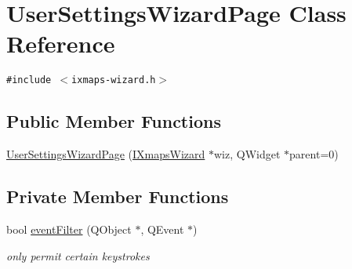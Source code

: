 \hypertarget{classUserSettingsWizardPage}{
\section{UserSettingsWizardPage Class Reference}
\label{classUserSettingsWizardPage}
}
{\tt \#include $<$ixmaps-wizard.h$>$}

\subsection*{Public Member Functions}
\begin{CompactItemize}
\item 
\hyperlink{classUserSettingsWizardPage_9eac3682eabd518712190d0fafada08b}{UserSettingsWizardPage} (\hyperlink{classIXmapsWizard}{IXmapsWizard} $\ast$wiz, QWidget $\ast$parent=0)
\end{CompactItemize}
\subsection*{Private Member Functions}
\begin{CompactItemize}
\item 
\hypertarget{classUserSettingsWizardPage_2ccdd407c5a5e98e3eb30fb6e0e8d304}{
bool \hyperlink{classUserSettingsWizardPage_2ccdd407c5a5e98e3eb30fb6e0e8d304}{eventFilter} (QObject $\ast$, QEvent $\ast$)}
\label{classUserSettingsWizardPage_2ccdd407c5a5e98e3eb30fb6e0e8d304}

\begin{CompactList}\small\item\em only permit certain keystrokes \item\end{CompactList}\end{CompactItemize}
